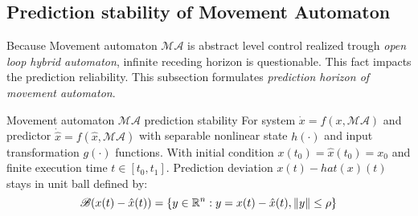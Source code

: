 \newpage\subsection{Prediction stability of Movement Automaton}\label{s:maConvergence}
\noindent Because Movement automaton $\mathscr{MA}$ is abstract level control realized trough \textit{open loop hybrid automaton}, infinite receding horizon is questionable. This fact impacts the prediction reliability. This subsection formulates \textit{prediction horizon of movement automaton}.

\begin{definition}{Movement automaton $\mathscr{MA}$ prediction stability}\label{def:maPredictionStability}
For system $\dot{x}=f(x,\mathscr{MA})$ and predictor $\dot{\hat{x}}=f(\hat{x},\mathscr{MA})$ with separable nonlinear state $h(\cdot)$ and input transformation $g(\cdot)$ functions. With initial condition $x(t_0)=\hat{x}(t_0)=x_0$ and finite execution time $t\in[t_0,t_1]$. Prediction deviation $x(t)-hat(x)(t)$ stays in unit ball defined by:
\begin{equation}
    \mathscr{B}(x(t)-\hat{x}(t))= \left\{y\in\mathbb{R}^n:y=x(t)-\hat{x}(t),\left\lVert y\right\rVert\le\rho\right\}
\end{equation}
\end{definition}

